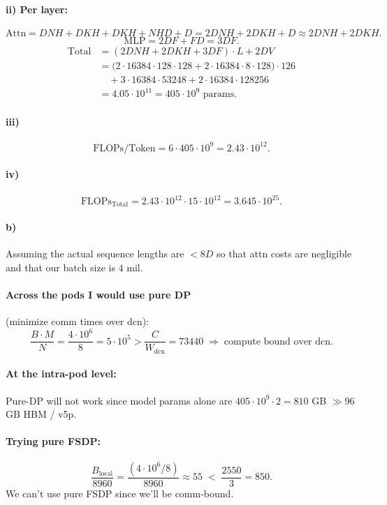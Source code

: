 \documentclass[11pt]{article}
\newcommand{\flops}{\text{FLOPs}}
\newcommand{\Wdcn}{W_{\text{dcn}}}
\begin{document}
\paragraph{ii) Per layer:}
\[
\text{Attn} = DNH + DKH + DKH + NHD + D = 2DNH + 2DKH + D \approx 2DNH + 2DKH.
\]
\[
\text{MLP} = 2DF + FD = 3DF.
\]
\begin{align*}
\text{Total} &= (2DNH + 2DKH + 3DF) \cdot L + 2DV \\
&= \big(2 \cdot 16384 \cdot 128 \cdot 128 + 2 \cdot 16384 \cdot 8 \cdot 128\big) \cdot 126 \\
&\quad + 3 \cdot 16384 \cdot 53248 + 2 \cdot 16384 \cdot 128256 \\
&= 4.05 \cdot 10^{11} = 405 \cdot 10^9 \text{ params.}
\end{align*}

\paragraph{iii)}
\[
\flops / \text{Token} = 6 \cdot 405 \cdot 10^9 = 2.43 \cdot 10^{12}.
\]

\paragraph{iv)}
\[
\flops_{\text{Total}} = 2.43 \cdot 10^{12} \cdot 15 \cdot 10^{12} = 3.645 \cdot 10^{25}.
\]

\paragraph{b)} Assuming the actual sequence lengths are $< 8D$ so that attn costs are negligible and that our batch size is $4$ mil.

\paragraph{Across the pods I would use pure DP} (minimize comm times over dcn):
\[
\frac{B \cdot M}{N} = \frac{4 \cdot 10^6}{8} = 5 \cdot 10^5 > \frac{C}{\Wdcn} = 73440
\;\Rightarrow\; \text{compute bound over dcn.}
\]

\paragraph{At the intra-pod level:}
Pure-DP will not work since model params alone are $405 \cdot 10^9 \cdot 2 = 810$ GB $\gg 96$ GB HBM / v5p.

\paragraph{Trying pure FSDP:}
\[
\frac{B_{\text{local}}}{8960} = \frac{(4 \cdot 10^6 / 8)}{8960} \approx 55 \;<\; \frac{2550}{3} = 850.
\]
We can't use pure FSDP since we'll be comm-bound.
\end{document}
